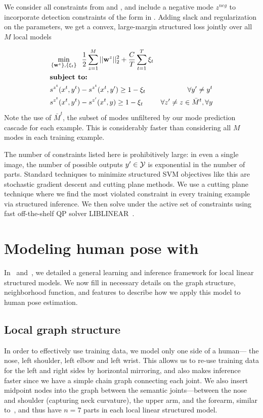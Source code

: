 We consider all constraints from  and , and include a 
negative mode $z^{neg}$ to incorporate detection constraints of the form in 
.  Adding slack and regularization on the parameters, we get a 
convex, large-margin structured loss jointly over all $M$ local models

\begin{align}\label{eq:full-learn}
&\min_{\{\mathbf{w}^z\}, \{\xi_{t}\}} \;\; \frac{1}{2} \sum_{z=1}^M ||\mathbf{w}^z||_2^2 + 
\frac{C}{T} \sum_{t=1}^T \xi_t \\
&\text{\bf{subject to:} } \\
&s^{z^t}(x^t,y^t) - s^{z^t}(x^t,y') \geq 1 - \xi_t\;\; &\forall y' \neq y^t \\
&s^{z^t}(x^t,y^t) - s^{z'}(x^t,y)  \geq 1 - \xi_t\;\; &\forall z' \neq z \in 
\bar{M}^t, \forall y \end{align}
Note the use of $\bar{M}^t$, the subset of modes unfiltered by our mode 
prediction cascade for each example.  This is considerably faster than 
considering all $M$ modes in each training example. 

The number of constraints listed here is prohibitively large: in even a single 
image, the number of possible outputs $y' \in \mathcal{Y}$ is exponential in the number 
of parts.  Standard techniques to minimize structured SVM objectives like this 
are stochastic gradient descent and cutting plane methods.  We use a cutting 
plane technique where we find the most violated constraint in every training 
example via structured inference.  We then solve  under the 
active set of constraints using fast off-the-shelf QP solver 
LIBLINEAR~\citep{liblinear}.  

\section{Modeling human pose with \LLPS}
In~ and~, we detailed a general 
learning and inference framework for local linear structured models.  We now 
fill in necessary details on the graph structure, neighborhood function, and 
features to describe how we apply this model to human pose estimation.
\subsection{Local graph structure}
In order to effectively use training data, we model only one side of a human--- 
the nose, left shoulder, left elbow and left wrist. This allows us to re-use 
training data for the left and right sides by horizontal mirroring, and also 
makes inference faster since we have a simple chain graph connecting each 
joint.  We also insert midpoint nodes into the graph between the semantic 
joints---between the nose and shoulder  (capturing neck curvature), the upper 
arm, and the forearm, similar to~\citet{deva2011}, and thus have $n=7$ parts in 
each local linear structured model.

